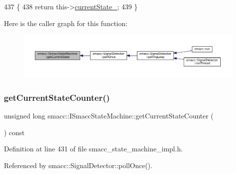 \begin{DoxyCode}
437 \{
438     \textcolor{keywordflow}{return} this->\hyperlink{classsmacc_1_1ISmaccStateMachine_a9c6e7745205bcce80a301f2fbe8f7e99}{currentState\_};
439 \}
\end{DoxyCode}
Here is the caller graph for this function\+:
\nopagebreak
\begin{figure}[H]
\begin{center}
\leavevmode
\includegraphics[width=350pt]{classsmacc_1_1ISmaccStateMachine_a610d09dc5341fb63732be713c21fbe86_icgraph}
\end{center}
\end{figure}
\mbox{\label{classsmacc_1_1ISmaccStateMachine_aad27c0182b53245d0aded22e63cd83bd}} 
\subsubsection{\texorpdfstring{get\+Current\+State\+Counter()}{getCurrentStateCounter()}}
{\footnotesize\ttfamily unsigned long smacc\+::\+I\+Smacc\+State\+Machine\+::get\+Current\+State\+Counter (\begin{DoxyParamCaption}{ }\end{DoxyParamCaption}) const\hspace{0.3cm}{\ttfamily [inline]}}



Definition at line 431 of file smacc\+\_\+state\+\_\+machine\+\_\+impl.\+h.



Referenced by smacc\+::\+Signal\+Detector\+::poll\+Once().


